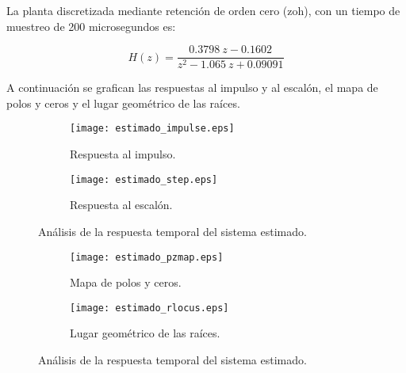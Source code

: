La planta discretizada mediante retención de orden cero (zoh), con un tiempo de muestreo de 200
microsegundos es:

\vspace{-0.5cm}
\begin{equation}
    H(z) = \dfrac{0.3798\ z - 0.1602}{z^2 - 1.065\ z + 0.09091}
\end{equation}
\vspace{-0.5cm}

A continuación se grafican las respuestas al impulso y al escalón, el mapa de polos y ceros y el lugar
geométrico de las raíces.

\begin{figure}[H]
    \centering

    \begin{subfigure}[b]{0.49\textwidth}
        \centering
        \texttt{[image: estimado\_impulse.eps]}
        \caption{Respuesta al impulso.}
        \label{fig:estimado_impulse}
    \end{subfigure}
    \begin{subfigure}[b]{0.49\textwidth}
        \centering
        \texttt{[image: estimado\_step.eps]}
        \caption{Respuesta al escalón.}
        \label{fig:estimado_step}
    \end{subfigure}

    \vspace{-0.25cm}
    \caption{Análisis de la respuesta temporal del sistema estimado.}
    \label{fig:estimado_respuestas}
\end{figure}
\vspace{-0.5cm}

\begin{figure}[H]
    \centering

    \begin{subfigure}[b]{0.49\textwidth}
        \centering
        \texttt{[image: estimado\_pzmap.eps]}
        \caption{Mapa de polos y ceros.}
        \label{fig:estimado_pzmap}
    \end{subfigure}
    \begin{subfigure}[b]{0.49\textwidth}
        \centering
        \texttt{[image: estimado\_rlocus.eps]}
        \caption{Lugar geométrico de las raíces.}
        \label{fig:estimado_rlocus}
    \end{subfigure}

    \vspace{-0.25cm}
    \caption{Análisis de la respuesta temporal del sistema estimado.}
    \label{fig:estimado_estabilidad}
\end{figure}
\vspace{-0.5cm}

